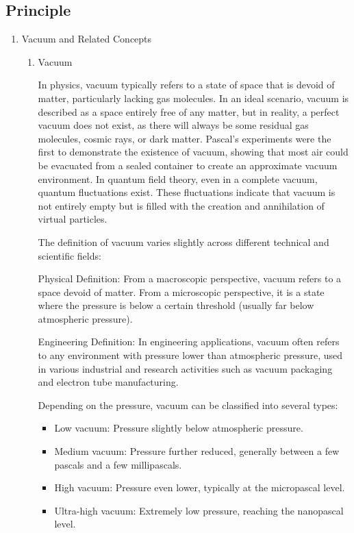 \subsection{Principle}
\begin{enumerate}
	\item Vacuum and Related Concepts
	\begin{enumerate}
		\item Vacuum
		
		In physics, vacuum typically refers to a state of space that is devoid of matter, particularly lacking gas molecules. In an ideal scenario, vacuum is described as a space entirely free of any matter, but in reality, a perfect vacuum does not exist, as there will always be some residual gas molecules, cosmic rays, or dark matter. Pascal's experiments were the first to demonstrate the existence of vacuum, showing that most air could be evacuated from a sealed container to create an approximate vacuum environment. In quantum field theory, even in a complete vacuum, quantum fluctuations exist. These fluctuations indicate that vacuum is not entirely empty but is filled with the creation and annihilation of virtual particles.
		
		The definition of vacuum varies slightly across different technical and scientific fields:
		
		Physical Definition: From a macroscopic perspective, vacuum refers to a space devoid of matter. From a microscopic perspective, it is a state where the pressure is below a certain threshold (usually far below atmospheric pressure).
		
		Engineering Definition: In engineering applications, vacuum often refers to any environment with pressure lower than atmospheric pressure, used in various industrial and research activities such as vacuum packaging and electron tube manufacturing.
		
		Depending on the pressure, vacuum can be classified into several types:
		\begin{itemize}
			\item Low vacuum: Pressure slightly below atmospheric pressure.
			\item Medium vacuum: Pressure further reduced, generally between a few pascals and a few millipascals.
			\item High vacuum: Pressure even lower, typically at the micropascal level.
			\item Ultra-high vacuum: Extremely low pressure, reaching the nanopascal level.
		\end{itemize}
		

\end{enumerate}
\end{enumerate}
